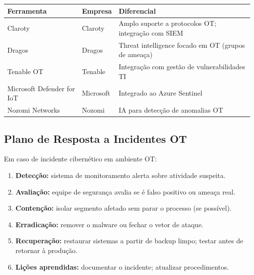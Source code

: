 \begin{longtable}[]{@{}
  >{\raggedright\arraybackslash}p{}
  >{\raggedright\arraybackslash}p{}
  >{\raggedright\arraybackslash}p{}@{}}
\toprule\noalign{}
\begin{minipage}[b]{\linewidth}\raggedright
Ferramenta
\end{minipage} & \begin{minipage}[b]{\linewidth}\raggedright
Empresa
\end{minipage} & \begin{minipage}[b]{\linewidth}\raggedright
Diferencial
\end{minipage} \\
\midrule\noalign{}
\endhead
\bottomrule\noalign{}
\endlastfoot
Claroty & Claroty & Amplo suporte a protocolos OT; integração com SIEM \\
Dragos & Dragos & Threat intelligence focado em OT (grupos de ameaça) \\
Tenable OT & Tenable & Integração com gestão de vulnerabilidades TI \\
Microsoft Defender for IoT & Microsoft & Integrado ao Azure Sentinel \\
Nozomi Networks & Nozomi & IA para detecção de anomalias OT \\
\end{longtable}

\subsection{Plano de Resposta a Incidentes OT}\label{plano-de-resposta-a-incidentes-ot}

Em caso de incidente cibernético em ambiente OT:

\begin{enumerate}
\def\labelenumi{\arabic{enumi}.}
\tightlist
\item
  \textbf{Detecção:} sistema de monitoramento alerta sobre atividade suspeita.
\item
  \textbf{Avaliação:} equipe de segurança avalia se é falso positivo ou ameaça real.
\item
  \textbf{Contenção:} isolar segmento afetado sem parar o processo (se possível).
\item
  \textbf{Erradicação:} remover o malware ou fechar o vetor de ataque.
\item
  \textbf{Recuperação:} restaurar sistemas a partir de backup limpo; testar antes de retornar à produção.
\item
  \textbf{Lições aprendidas:} documentar o incidente; atualizar procedimentos.
\end{enumerate}

